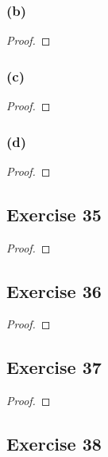 \documentclass[14pt]{extarticle}
\begin{document}
\subsubsection{(b)}

\begin{proof}

\end{proof}

\subsubsection{(c)}

\begin{proof}

\end{proof}

\subsubsection{(d)}

\begin{proof}

\end{proof}

\subsection{Exercise 35}

\begin{proof}

\end{proof}

\subsection{Exercise 36}

\begin{proof}

\end{proof}

\subsection{Exercise 37}

\begin{proof}

\end{proof}

\subsection{Exercise 38}
\end{document}
